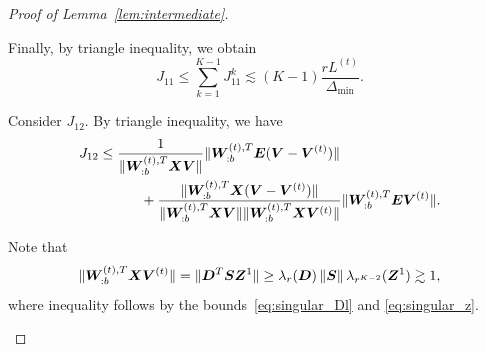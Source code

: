 \documentclass[lettersize,onecolumn,journal]{IEEEtran}
\theoremstyle{definition}
\theoremstyle{definition}
\newcommand{\offf}[1]{\left\{#1\right\}}
\def\fixme#1#2{\textbf{\color{red}[FIXME (#1): #2]}}
\begin{document}
\begin{proof}[Proof of Lemma~\ref{lem:intermediate}]
\begin{enumerate}
    
    Finally, by triangle inequality, we obtain
    \begin{equation}\label{eq:j1}
        J_{11} \leq \sum_{k = 1}^{K-1} J_{11}^k \lesssim (K-1)\frac{r L^{(t)}}{\Delta_{\min}}.
    \end{equation}
    
    
    Consider $J_{12}$. By triangle inequality, we have 
    \begin{align}
        J_{12} &\leq \frac{ 1}{\lVert\bm{W}_{:b}^{(t),T} \bm X \bm{V} \rVert} \lVert\bm{W}_{:b}^{(t),T} \bm{E} (\bm{V}-\bm{V}^{(t)})\rVert \\ &\quad \quad \quad  +
        \frac{ \lVert\bm{W}_{:b}^{(t),T} \bm X (\bm{V}-\bm{V}^{(t)})\rVert }{\lVert\bm{W}_{:b}^{(t),T} \bm X \bm{V} \rVert\lVert\bm{W}_{:b}^{(t),T} \bm X \bm{V}^{(t)} \rVert} \lVert\bm{W}_{:b}^{(t),T} \bm{E} \bm{V}^{(t)} \rVert.
    \end{align}

     Note that 
    \begin{equation}\label{eq:j11_wxvt}
       \onormSize{}{\mW_{:b}^{(t),T} \mX \mV^{(t)}} = \onormSize{}{\mD^T \mS \mZ^1} \geq \lambda_r(\mD) \onorm{\mS} \lambda_{r^{K-2}}(\mZ^1) \gtrsim 1,
    \end{equation}
    where inequality follows by the bounds~\eqref{eq:singular_Dl} and \eqref{eq:singular_z}.
    

\end{enumerate}
\end{proof}
\end{document}
